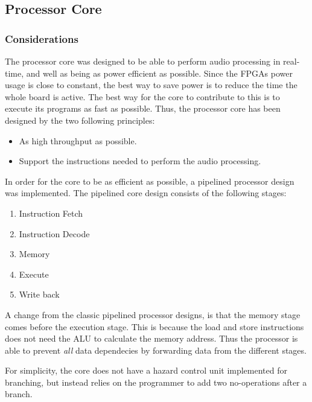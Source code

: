 \FloatBarrier
\subsection{Processor Core}\label{subsec:fpga-processor-core}

\subsubsection{Considerations}

The processor core was designed to be able to perform audio processing in real-time, and well as being as power efficient as possible. Since the FPGAs power usage is close to constant, the best way to save power is to reduce the time the whole board is active. The best way for the core to contribute to this is to execute its programs as fast as possible. Thus, the processor core has been designed by the two following principles:

\begin{itemize}
	\item As high throughput as possible.
	\item Support the instructions needed to perform the audio processing.
\end{itemize}

In order for the core to be as efficient as possible, a pipelined processor
design was implemented. The pipelined core design consists of the following
stages:

\begin{enumerate}
	\item Instruction Fetch \label{stage:if}
	\item Instruction Decode \label{stage:id}
	\item Memory \label{stage:mem}
	\item Execute \label{stage:ex}
	\item Write back \label{stage:wb}
\end{enumerate}

A change from the classic pipelined processor designs, is that the memory stage comes before the execution stage. This is because the load and store instructions does not need the ALU to calculate the memory address. Thus the processor is able to prevent \textit{all} data dependecies by forwarding data from the different stages.

For simplicity, the core does not have a hazard control unit implemented for
branching, but instead relies on the programmer to add two no-operations after a
branch.

